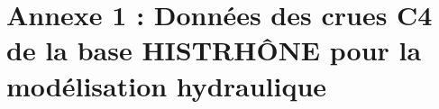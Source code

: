 \documentclass[11pt]{article}
\begin{document}
\newpage

\section{Annexe 1 : Données des crues C4 de la base HISTRHÔNE pour la modélisation hydraulique}
\label{sec:TabC4}
%
%
%	
\end{document}
